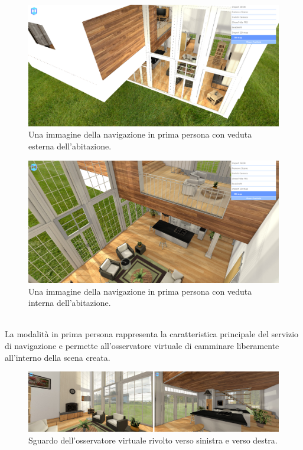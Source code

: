\\
\begin{figure}[htb]
 \centering
 \includegraphics[width=0.96\linewidth]{images/chapter_navigazione_scena/navigator_est.png}\hfill
 \caption[Navigazione dall'alto: veduta esterna]{Una immagine della navigazione in prima persona con veduta esterna dell'abitazione.}
 \label{fig:navigazione_scena_navigator_est}
\end{figure}
\begin{figure}[htb]
 \centering
 \includegraphics[width=0.96\linewidth]{images/chapter_navigazione_scena/navigator_int.png}\hfill
 \caption[Navigazione dall'alto: veduta esterna]{Una immagine della navigazione in prima persona con veduta interna dell'abitazione.}
 \label{fig:navigazione_scena_navigator_int}
\end{figure}
\\
La modalità in prima persona rappresenta la caratteristica principale del servizio di navigazione e permette all’osservatore virtuale di camminare liberamente all’interno della scena creata.
\begin{figure}[htb]
 \centering
 \includegraphics[width=0.99\linewidth]{images/chapter_navigazione_scena/vis_sin_des.png}\hfill
 \caption[Esempio 1 di osservazione virtuale]{Sguardo dell'osservatore virtuale rivolto verso sinistra e verso destra.}
 \label{fig:navigazione_scena_vis_sin_des}
\end{figure}
